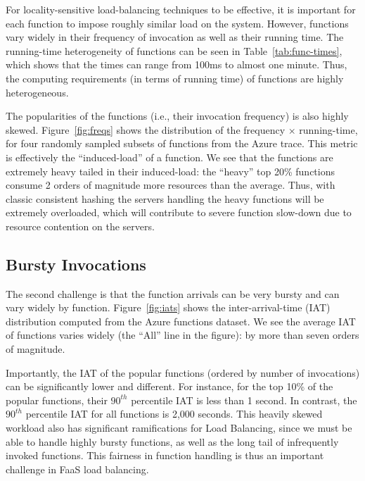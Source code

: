 For locality-sensitive load-balancing techniques to be effective, it is important for each function to impose roughly similar load on the system. 
However, functions vary widely in their frequency of invocation as well as their running time. 
The running-time heterogeneity of functions can be seen in Table~\ref{tab:func-times}, which shows that the times can range from 100ms to almost one minute.
Thus, the computing requirements (in terms of running time) of functions are highly heterogeneous. 

The popularities of the functions (i.e., their invocation frequency) is also highly skewed. 
Figure~\ref{fig:freqs} shows the distribution of the frequency $\times$ running-time, for four randomly sampled subsets of functions from the Azure trace. 
This metric is effectively the ``induced-load'' of a function. 
We see that the functions are extremely heavy tailed in their induced-load: the ``heavy'' top 20\% functions consume 2 orders of magnitude more resources than the average. 
Thus, with classic consistent hashing the servers handling the heavy functions will be extremely overloaded, which will contribute to severe function slow-down due to resource contention on the servers. 

\subsection{Bursty Invocations}

The second challenge is that the function arrivals can be very bursty and can vary widely by function. 
Figure~\ref{fig:iats} shows the inter-arrival-time (IAT) distribution computed from the Azure functions dataset. 
We see the average IAT of functions varies widely (the ``All'' line in the figure): by more than seven orders of magnitude.

Importantly, the IAT of the popular functions (ordered by number of invocations) can be significantly lower and different. For instance, for the top 10\% of the popular functions, their $90^{th}$ percentile IAT is less than 1 second. In contrast, the $90^{th}$ percentile IAT for all functions is 2,000 seconds.
%
This heavily skewed workload also has significant ramifications for Load Balancing, since we must be able to handle highly bursty functions, as well as the long tail of infrequently invoked functions.
This fairness in function handling is thus an important challenge in FaaS load balancing. 


